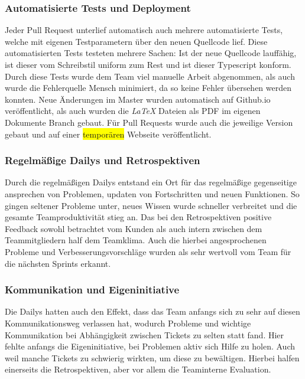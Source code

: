 \documentclass[10pt, a4paper, draft]{article}
\begin{document}
\subsubsection{Automatisierte Tests und Deployment}
Jeder Pull Request unterlief automatisch auch mehrere automatisierte Tests, welche mit eigenen Testparametern über den neuen Quellcode lief.
Diese automatisierten Tests testeten mehrere Sachen: Ist der neue Quellcode lauffähig, ist dieser vom Schreibstil uniform zum Rest und ist dieser Typescript konform.
Durch diese Tests wurde dem Team viel manuelle Arbeit abgenommen, als auch wurde die Fehlerquelle Mensch minimiert, da so keine Fehler übersehen werden konnten.
Neue Änderungen im Master wurden automatisch auf Github.io veröffentlicht, als auch wurden die \textit{LaTeX} Dateien als PDF im eigenen Dokumente Branch gebaut.
Für Pull Requests wurde auch die jeweilige Version gebaut und auf einer \colorbox{yellow}{temporären} Webseite veröffentlicht.

\subsubsection{Regelmäßige Dailys und Retrospektiven}
Durch die regelmäßigen Dailys entstand ein Ort für das regelmäßige gegenseitige ansprechen von Problemen, updaten von Fortschritten und neuen Funktionen.
So gingen seltener Probleme unter, neues Wissen wurde schneller verbreitet und die gesamte Teamproduktivität stieg an.
Das bei den Retrospektiven positive Feedback sowohl betrachtet vom Kunden als auch intern zwischen dem Teammitgliedern half dem Teamklima.
Auch die hierbei angesprochenen Probleme und Verbesserungsvorschläge wurden als sehr wertvoll vom Team für die nächsten Sprints erkannt.

\subsubsection{Kommunikation und Eigeninitiative}
Die Dailys hatten auch den Effekt, dass das Team anfangs sich zu sehr auf diesen Kommunikationsweg verlassen hat, wodurch Probleme und wichtige Kommunikation bei Abhängigkeit zwischen Tickets zu selten statt fand.
Hier fehlte anfangs die Eigeninitiative, bei Problemen aktiv sich Hilfe zu holen.
Auch weil manche Tickets zu schwierig wirkten, um diese zu bewältigen.
Hierbei halfen einerseits die Retrospektiven, aber vor allem die Teaminterne Evaluation.
\end{document}
